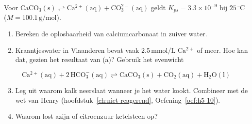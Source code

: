 \begin{oefening}
Voor \(\mathrm{CaCO_3(s) \rightleftharpoons Ca^{2+}(aq) + CO_3^{2-}(aq)}\) geldt \(K_{ps} = 3.3\times10^{-9}\) bij \(25\,^\circ\mathrm{C}\) (\(M = 100.1\,\mathrm{g/mol}\)).

\begin{enumerate}
\item[(a)]
  Bereken de oplosbaarheid van calciumcarbonaat in zuiver water.
\item[(b)]
  Kraantjeswater in Vlaanderen bevat vaak \(2.5\,\mathrm{mmol/L}\) \(\mathrm{Ca^{2+}}\) of meer. Hoe kan dat, gezien het resultaat van (a)? Gebruik het evenwicht
\end{enumerate}

\[
\mathrm{Ca^{2+}(aq) + 2\,HCO_3^-(aq) \rightleftharpoons CaCO_3(s) + CO_2(aq) + H_2O(l)}
\]

\begin{enumerate}
\setcounter{enumi}{2}
\item[(a)]
  Leg uit waarom kalk neerslaat wanneer je het water kookt. Combineer met de wet van Henry (hoofdstuk~\ref{ch:niet-reagerend}, Oefening~\ref{oef:h5-10}).
\item[(b)]
  Waarom lost azijn of citroenzuur ketelsteen op?
\end{enumerate}
\end{oefening}
